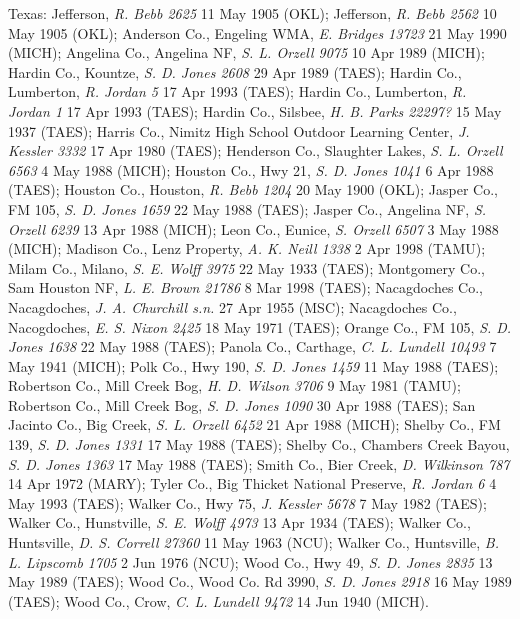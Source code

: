 \documentclass{article}
\begin{document}
Texas:
Jefferson, \textit{R. Bebb 2625} 11 May 1905 (OKL);
Jefferson, \textit{R. Bebb 2562} 10 May 1905 (OKL);
Anderson Co., Engeling WMA, \textit{E. Bridges 13723} 21 May 1990 (MICH);
Angelina Co., Angelina NF, \textit{S. L. Orzell 9075} 10 Apr 1989 (MICH);
Hardin Co., Kountze, \textit{S. D. Jones 2608} 29 Apr 1989 (TAES);
Hardin Co., Lumberton, \textit{R. Jordan 5} 17 Apr 1993 (TAES);
Hardin Co., Lumberton, \textit{R. Jordan 1} 17 Apr 1993 (TAES);
Hardin Co., Silsbee, \textit{H. B. Parks 22297?} 15 May 1937 (TAES);
Harris Co., Nimitz High School Outdoor Learning Center, \textit{J. Kessler 3332} 17 Apr 1980 (TAES);
Henderson Co., Slaughter Lakes, \textit{S. L. Orzell 6563} 4 May 1988 (MICH);
Houston Co., Hwy 21, \textit{S. D. Jones 1041} 6 Apr 1988 (TAES);
Houston Co., Houston, \textit{R. Bebb 1204} 20 May 1900 (OKL);
Jasper Co., FM 105, \textit{S. D. Jones 1659} 22 May 1988 (TAES);
Jasper Co., Angelina NF, \textit{S. Orzell 6239} 13 Apr 1988 (MICH);
Leon Co., Eunice, \textit{S. Orzell 6507} 3 May 1988 (MICH);
Madison Co., Lenz Property, \textit{A. K. Neill 1338} 2 Apr 1998 (TAMU);
Milam Co., Milano, \textit{S. E. Wolff 3975} 22 May 1933 (TAES);
Montgomery Co., Sam Houston NF, \textit{L. E. Brown 21786} 8 Mar 1998 (TAES);
Nacagdoches Co., Nacagdoches, \textit{J. A. Churchill s.n.} 27 Apr 1955 (MSC);
Nacagdoches Co., Nacogdoches, \textit{E. S. Nixon 2425} 18 May 1971 (TAES);
Orange Co., FM 105, \textit{S. D. Jones 1638} 22 May 1988 (TAES);
Panola Co., Carthage, \textit{C. L. Lundell 10493} 7 May 1941 (MICH);
Polk Co., Hwy 190, \textit{S. D. Jones 1459} 11 May 1988 (TAES);
Robertson Co., Mill Creek Bog, \textit{H. D. Wilson 3706} 9 May 1981 (TAMU);
Robertson Co., Mill Creek Bog, \textit{S. D. Jones 1090} 30 Apr 1988 (TAES);
San Jacinto Co., Big Creek, \textit{S. L. Orzell 6452} 21 Apr 1988 (MICH);
Shelby Co., FM 139, \textit{S. D. Jones 1331} 17 May 1988 (TAES);
Shelby Co., Chambers Creek Bayou, \textit{S. D. Jones 1363} 17 May 1988 (TAES);
Smith Co., Bier Creek, \textit{D. Wilkinson 787} 14 Apr 1972 (MARY);
Tyler Co., Big Thicket National Preserve, \textit{R. Jordan 6} 4 May 1993 (TAES);
Walker Co., Hwy 75, \textit{J. Kessler 5678} 7 May 1982 (TAES);
Walker Co., Hunstville, \textit{S. E. Wolff 4973} 13 Apr 1934 (TAES);
Walker Co., Huntsville, \textit{D. S. Correll 27360} 11 May 1963 (NCU);
Walker Co., Huntsville, \textit{B. L. Lipscomb 1705} 2 Jun 1976 (NCU);
Wood Co., Hwy 49, \textit{S. D. Jones 2835} 13 May 1989 (TAES);
Wood Co., Wood Co. Rd 3990, \textit{S. D. Jones 2918} 16 May 1989 (TAES);
Wood Co., Crow, \textit{C. L. Lundell 9472} 14 Jun 1940 (MICH).
\end{document}
